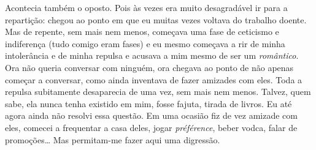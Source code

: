 Acontecia também o oposto. Pois às vezes era muito desagradável ir para
a repartição: chegou ao ponto em que eu muitas vezes voltava do
trabalho doente. Mas de repente, sem mais nem menos, começava uma fase
de ceticismo e indiferença (tudo comigo eram fases) e eu mesmo
começava a rir de minha intolerância e de minha repulsa e acusava a mim
mesmo de ser um \textit{romântico}. Ora não queria conversar com
ninguém, ora chegava ao ponto de não apenas começar a conversar, como
ainda inventava de fazer amizades com eles. Toda a repulsa subitamente
desaparecia de uma vez, sem mais nem menos. Talvez, quem sabe, ela
nunca tenha existido em mim, fosse fajuta, tirada de livros. Eu até
agora ainda não resolvi essa questão. Em uma ocasião fiz de vez amizade
com eles, comecei a frequentar a casa deles, jogar \textit{préférence},
beber vodca, falar de promoções\ldots{} Mas permitam-me fazer aqui uma
digressão.

